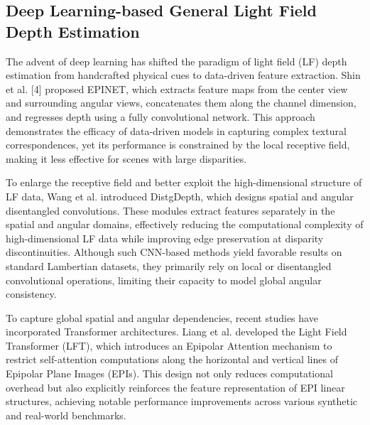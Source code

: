 \subsection{Deep Learning-based General Light Field Depth Estimation}

The advent of deep learning has shifted the paradigm of light field (LF) depth estimation from handcrafted physical cues to data-driven feature extraction. Shin et al. [4] proposed EPINET, which extracts feature maps from the center view and surrounding angular views, concatenates them along the channel dimension, and regresses depth using a fully convolutional network. This approach demonstrates the efficacy of data-driven models in capturing complex textural correspondences, yet its performance is constrained by the local receptive field, making it less effective for scenes with large disparities.

To enlarge the receptive field and better exploit the high-dimensional structure of LF data, Wang et al. introduced DistgDepth, which designs spatial and angular disentangled convolutions. These modules extract features separately in the spatial and angular domains, effectively reducing the computational complexity of high-dimensional LF data while improving edge preservation at disparity discontinuities. Although such CNN-based methods yield favorable results on standard Lambertian datasets, they primarily rely on local or disentangled convolutional operations, limiting their capacity to model global angular consistency.

To capture global spatial and angular dependencies, recent studies have incorporated Transformer architectures. Liang et al. developed the Light Field Transformer (LFT), which introduces an Epipolar Attention mechanism to restrict self-attention computations along the horizontal and vertical lines of Epipolar Plane Images (EPIs). This design not only reduces computational overhead but also explicitly reinforces the feature representation of EPI linear structures, achieving notable performance improvements across various synthetic and real-world benchmarks.

